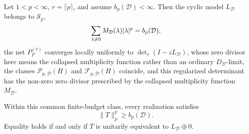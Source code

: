 \begin{theorem}
  \label{thm:schatten-determinant-fiber-minimality}
  Let \(1<p<\infty\), \(r=\lceil p\rceil\), and assume
  \(b_p(\mathcal D)<\infty\).  Then the cyclic model
  \(L_{\mathcal D}\) belongs to \(\mathcal S_p\),
  \[
    \sum_{\lambda\ne0}M_{\mathcal D}(\lambda)\lvert \lambda \rvert^{p}
    =b_p(\mathcal D),
  \]
  the net \(P_F^{(r)}\) converges locally uniformly to
  \(\det_r(I-zL_{\mathcal D})\), whose zero divisor here means the collapsed
  multiplicity function rather than an ordinary \(D_{\mathcal D}\)-limit, the classes
  \(\mathcal P_{p,\mathcal D}(H)\) and
  \(\mathcal F_{p,\mathcal D}(H)\) coincide, and this regularized determinant
  has the non-zero zero divisor prescribed by the collapsed multiplicity
  function \(M_{\mathcal D}\).

  Within this common finite-budget class, every realization
  satisfies
  \[
    \|T\|_p^p\ge b_p(\mathcal D).
  \]
  Equality holds if and only if \(T\) is unitarily equivalent to
  \(L_{\mathcal D}\oplus0\).
\end{theorem}

